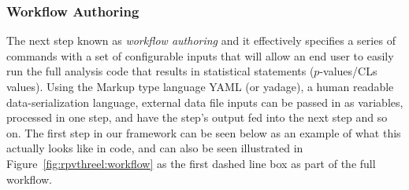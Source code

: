 \subsubsection{Workflow Authoring}
The next step known as \emph{workflow authoring} and it effectively specifies a series of commands with a set of configurable inputs that will allow an end user to easily run the full analysis code that results in statistical statements ($p$-values/CLs values).
Using the Markup type language YAML (or yadage), a human readable data-serialization language, external data file inputs can be passed in as variables, processed in one step, and have the step's output fed into the next step and so on.
The first step in our framework can be seen below as an example of what this actually looks like in code, and can also be seen illustrated in Figure~\ref{fig:rpvthreel:workflow} as the first dashed line box as part of the full workflow.
